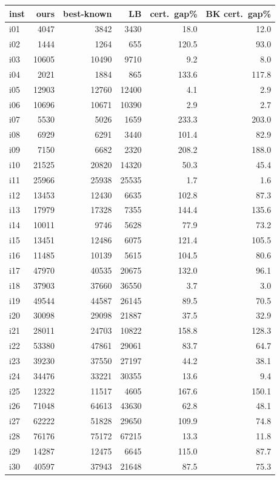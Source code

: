 \begin{center}\small
\begin{tabular}{lrrrrr}
\toprule
inst & ours & best-known & LB & cert.\ gap\% & BK cert.\ gap\%\\
\midrule
i01 & 4047 & 3842 & 3430 & 18.0 & 12.0\\
i02 & 1444 & 1264 & 655 & 120.5 & 93.0\\
i03 & 10605 & 10490 & 9710 & 9.2 & 8.0\\
i04 & 2021 & 1884 & 865 & 133.6 & 117.8\\
i05 & 12903 & 12760 & 12400 & 4.1 & 2.9\\
i06 & 10696 & 10671 & 10390 & 2.9 & 2.7\\
i07 & 5530 & 5026 & 1659 & 233.3 & 203.0\\
i08 & 6929 & 6291 & 3440 & 101.4 & 82.9\\
i09 & 7150 & 6682 & 2320 & 208.2 & 188.0\\
i10 & 21525 & 20820 & 14320 & 50.3 & 45.4\\
i11 & 25966 & 25938 & 25535 & 1.7 & 1.6\\
i12 & 13453 & 12430 & 6635 & 102.8 & 87.3\\
i13 & 17979 & 17328 & 7355 & 144.4 & 135.6\\
i14 & 10011 & 9746 & 5628 & 77.9 & 73.2\\
i15 & 13451 & 12486 & 6075 & 121.4 & 105.5\\
i16 & 11485 & 10139 & 5615 & 104.5 & 80.6\\
i17 & 47970 & 40535 & 20675 & 132.0 & 96.1\\
i18 & 37903 & 37660 & 36550 & 3.7 & 3.0\\
i19 & 49544 & 44587 & 26145 & 89.5 & 70.5\\
i20 & 30098 & 29098 & 21887 & 37.5 & 32.9\\
i21 & 28011 & 24703 & 10822 & 158.8 & 128.3\\
i22 & 53380 & 47861 & 29061 & 83.7 & 64.7\\
i23 & 39230 & 37550 & 27197 & 44.2 & 38.1\\
i24 & 34476 & 33221 & 30355 & 13.6 & 9.4\\
i25 & 12322 & 11517 & 4605 & 167.6 & 150.1\\
i26 & 71048 & 64613 & 43630 & 62.8 & 48.1\\
i27 & 62222 & 51828 & 29650 & 109.9 & 74.8\\
i28 & 76176 & 75172 & 67215 & 13.3 & 11.8\\
i29 & 14287 & 12475 & 6645 & 115.0 & 87.7\\
i30 & 40597 & 37943 & 21648 & 87.5 & 75.3\\
\bottomrule
\end{tabular}
\end{center}
